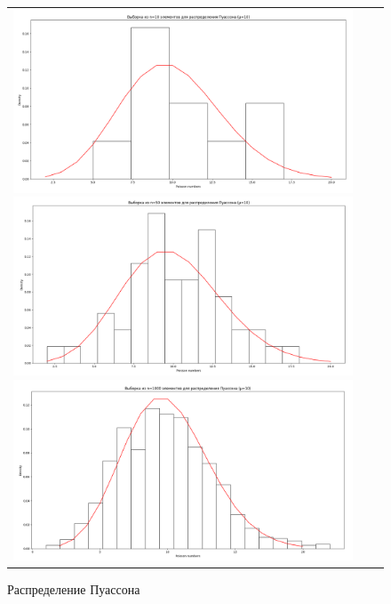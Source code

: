 \begin{figure}[H]
	\begin{tabular}{ccc}
		\includegraphics[scale=0.12]{resources/1_poisson_10.png}
		\includegraphics[scale=0.12]{resources/1_poisson_50.png}
		\includegraphics[scale=0.12]{resources/1_poisson_1000.png}
	\end{tabular}
	\caption{Распределение Пуассона}
\end{figure}



